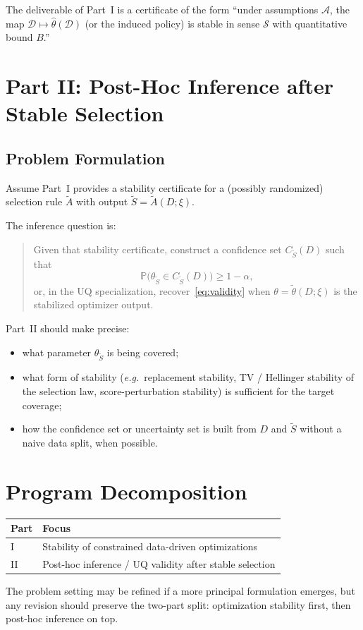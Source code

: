 \documentclass[12pt]{article}
\newcommand*{\eg}{\emph{e.g.}{}}
\theoremstyle{plain}
\begin{document}
The deliverable of Part~I is a certificate of the form
``under assumptions \(\mathcal{A}\), the map \(\mathcal{D}\mapsto\hat\theta(\mathcal{D})\)
(or the induced policy) is stable in sense \(\mathcal{S}\) with
quantitative bound \(B\).''

\section{Part II: Post-Hoc Inference after Stable Selection}
\subsection{Problem Formulation}
Assume Part~I provides a stability certificate for a (possibly
randomized) selection rule \(\widetilde A\) with output
\(\widetilde S=\widetilde A(D;\xi)\).

The inference question is:
\begin{quote}
Given that stability certificate, construct a confidence set
\(C_{\widetilde S}(D)\) such that
\[
\mathbb{P}\bigl(\theta_{\widetilde S}\in C_{\widetilde S}(D)\bigr)
\ge 1-\alpha,
\]
or, in the UQ specialization, recover~\eqref{eq:validity} when
\(\theta=\widetilde\theta(D;\xi)\) is the stabilized optimizer output.
\end{quote}

Part~II should make precise:
\begin{itemize}
\item what parameter \(\theta_{\widetilde S}\) is being covered;
\item what form of stability (\eg\ replacement stability, TV / Hellinger
stability of the selection law, score-perturbation stability) is
sufficient for the target coverage;
\item how the confidence set or uncertainty set is built from \(D\) and
\(\widetilde S\) without a naive data split, when possible.
\end{itemize}

\section{Program Decomposition}
\begin{center}
\begin{tabular}{@{}ll@{}}
\toprule
Part & Focus \\
\midrule
I & Stability of constrained data-driven optimizations \\
II & Post-hoc inference / UQ validity after stable selection \\
\bottomrule
\end{tabular}
\end{center}

The problem setting may be refined if a more principal formulation
emerges, but any revision should preserve the two-part split:
optimization stability first, then post-hoc inference on top.
\end{document}
